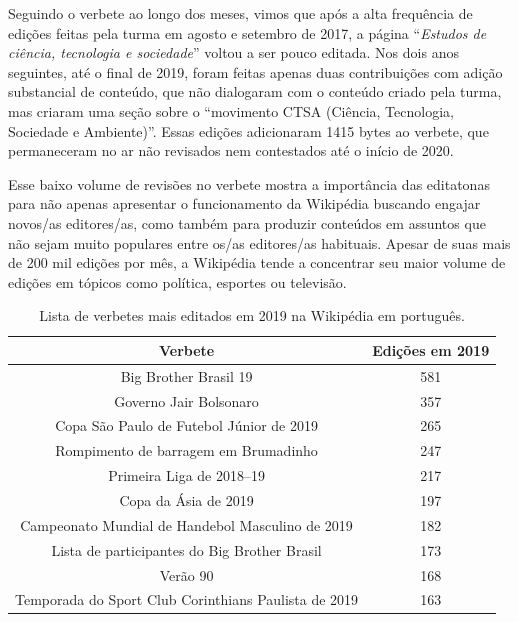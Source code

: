 Seguindo o verbete ao longo dos meses, vimos que após a alta frequência de edições feitas pela turma em agosto e setembro de 2017, a página ``\textit{Estudos de ciência, tecnologia e sociedade}'' voltou a ser pouco editada. Nos dois anos seguintes, até o final de 2019, foram feitas apenas duas contribuições com adição substancial de conteúdo, que não dialogaram com o conteúdo criado pela turma, mas criaram uma seção sobre o ``movimento CTSA (Ciência, Tecnologia, Sociedade e Ambiente)''. Essas edições adicionaram 1415 bytes ao verbete, que permaneceram no ar não revisados nem contestados até o início de 2020.

Esse baixo volume de revisões no verbete mostra a importância das editatonas para não apenas apresentar o funcionamento da Wikipédia buscando engajar novos/as editores/as, como também para produzir conteúdos em assuntos que não sejam muito populares entre os/as editores/as habituais. Apesar de suas mais de 200 mil edições por mês, a Wikipédia tende a concentrar seu maior volume de edições em tópicos como política, esportes ou televisão.\citep{quarry_most_edited_pages_ptwiki_2019}

\begin{center}
\begin{table}[hbt]
\begin{tabular}{ |c|c| } 
 \hline
\textbf{Verbete} & \textbf{Edições em 2019} \\ 
\hline
Big Brother Brasil 19 & 581 \\ 
\hline
Governo Jair Bolsonaro & 357 \\ 
\hline
Copa São Paulo de Futebol Júnior de 2019 & 265 \\ 
\hline
Rompimento de barragem em Brumadinho & 247 \\ 
\hline
Primeira Liga de 2018–19 & 217 \\ 
\hline
Copa da Ásia de 2019 & 197 \\ 
\hline
Campeonato Mundial de Handebol Masculino de 2019 & 182 \\ 
\hline
Lista de participantes do Big Brother Brasil & 173 \\ 
\hline
Verão 90 & 168 \\ 
\hline
Temporada do Sport Club Corinthians Paulista de 2019 & 163 \\ 
 \hline
\end{tabular}
\caption{Lista de verbetes mais editados em 2019 na Wikipédia em português.}
\label{table:verbetes-mais-editados-2019}
\end{table}
\end{center}


